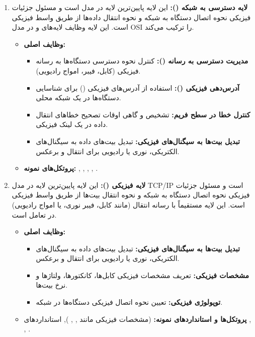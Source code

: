 \begin{enumerate}
	\item \textbf{لایه دسترسی به شبکه ():}
	این لایه پایین‌ترین لایه در مدل  است و مسئول جزئیات فیزیکی نحوه اتصال دستگاه به شبکه و نحوه انتقال داده‌ها از طریق واسط فیزیکی است. این لایه وظایف لایه‌های  و  در مدل OSI را ترکیب می‌کند.
	\begin{itemize}
		\item \textbf{وظایف اصلی:}
		\begin{itemize}
			\item \textbf{مدیریت دسترسی به رسانه ():} کنترل نحوه دسترسی دستگاه‌ها به رسانه فیزیکی (کابل، فیبر، امواج رادیویی).
			\item \textbf{آدرس‌دهی فیزیکی ():} استفاده از آدرس‌های فیزیکی () برای شناسایی دستگاه‌ها در یک شبکه محلی.
			\item \textbf{کنترل خطا در سطح فریم:} تشخیص و گاهی اوقات تصحیح خطاهای انتقال داده در یک لینک فیزیکی.
			\item \textbf{تبدیل بیت‌ها به سیگنال‌های فیزیکی:} تبدیل بیت‌های داده به سیگنال‌های الکتریکی، نوری یا رادیویی برای انتقال و برعکس.
		\end{itemize}
		\item \textbf{پروتکل‌های نمونه:} , , , , .
	\end{itemize}
	
	\item \textbf{لایه فیزیکی ():}
	این لایه پایین‌ترین لایه در مدل TCP/IP است و مسئول جزئیات فیزیکی نحوه اتصال دستگاه به شبکه و نحوه انتقال بیت‌ها از طریق واسط فیزیکی است. این لایه مستقیماً با رسانه انتقال (مانند کابل، فیبر نوری، یا امواج رادیویی) در تعامل است.
	\begin{itemize}
		\item \textbf{وظایف اصلی:}
		\begin{itemize}
			\item \textbf{تبدیل بیت‌ها به سیگنال‌های فیزیکی:} تبدیل بیت‌های داده به سیگنال‌های الکتریکی، نوری یا رادیویی برای انتقال و برعکس.
			\item \textbf{مشخصات فیزیکی:} تعریف مشخصات فیزیکی کابل‌ها، کانکتورها، ولتاژها و نرخ بیت‌ها.
			\item \textbf{توپولوژی فیزیکی:} تعیین نحوه اتصال فیزیکی دستگاه‌ها در شبکه.
		\end{itemize}
		\item \textbf{پروتکل‌ها و استانداردهای نمونه:}  (مشخصات فیزیکی مانند , , ), استانداردهای , , .
	\end{itemize}
\end{enumerate}

